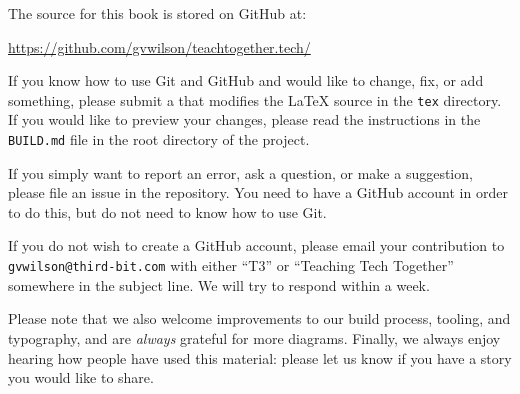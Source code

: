 The source for this book is stored on GitHub at:

\begin{center}
  \url{https://github.com/gvwilson/teachtogether.tech/}
\end{center}

\noindent
If you know how to use Git and
GitHub and would like to change, fix, or add something, please
submit a  that modifies the LaTeX
source in the \texttt{tex} directory. If you would like to preview your
changes, please read the instructions in the \texttt{BUILD.md} file in the
root directory of the project.

If you simply want to report an error, ask a question, or make a
suggestion, please file an issue in the repository. You need to have a GitHub account in
order to do this, but do not need to know how to use Git.

If you do not wish to create a GitHub account, please email your
contribution to \texttt{gvwilson@third-bit.com} with either
``T3'' or ``Teaching Tech Together'' somewhere in the subject line. We
will try to respond within a week.

Please note that we also welcome improvements to our build process, tooling, and typography,
and are \emph{always} grateful for more diagrams.
Finally, we always enjoy hearing how people have used this material:
please let us know if you have a story you would like to share.

